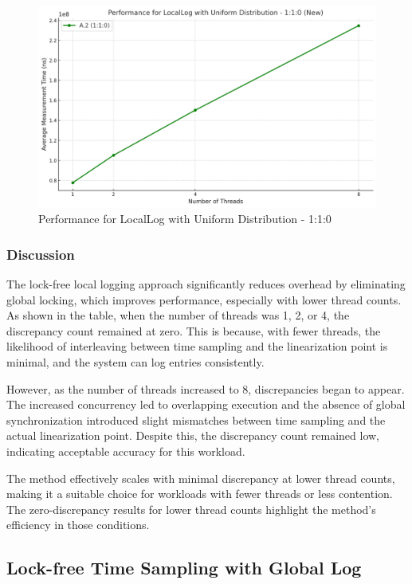 \documentclass{article}
\begin{document}
\begin{figure}[H]
    \centering
    \includegraphics[width=\textwidth]{LaTex/images/Lab 3 2.4.2.2.png}
    \caption{Performance for LocalLog with Uniform Distribution - 1:1:0}
    \label{fig:performance_a2}
\end{figure}


\subsubsection{Discussion}
The lock-free local logging approach significantly reduces overhead by eliminating global locking, which improves performance, especially with lower thread counts. As shown in the table, when the number of threads was 1, 2, or 4, the discrepancy count remained at zero. This is because, with fewer threads, the likelihood of interleaving between time sampling and the linearization point is minimal, and the system can log entries consistently.

However, as the number of threads increased to 8, discrepancies began to appear. The increased concurrency led to overlapping execution and the absence of global synchronization introduced slight mismatches between time sampling and the actual linearization point. Despite this, the discrepancy count remained low, indicating acceptable accuracy for this workload.

The method effectively scales with minimal discrepancy at lower thread counts, making it a suitable choice for workloads with fewer threads or less contention. The zero-discrepancy results for lower thread counts highlight the method's efficiency in those conditions.


\newpage
\subsection{Lock-free Time Sampling with Global Log}
\end{document}
